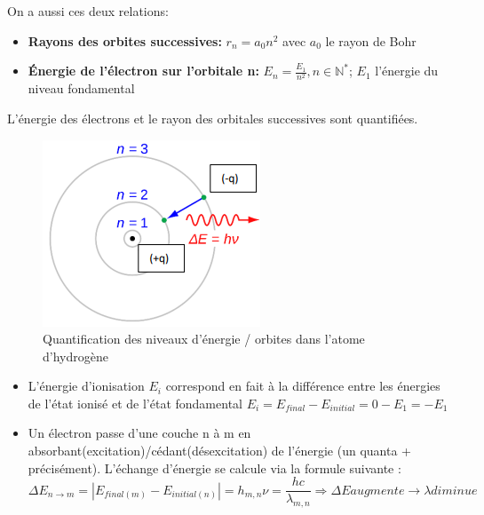 \documentclass{article}
\begin{document}
\noindent On a aussi ces deux relations:
\begin{itemize}
    \item \textbf{Rayons des orbites successives:} $r_{n} = a_{0}n^{2}$ avec $a_{0}$ le rayon de Bohr
    \item \textbf{Énergie de l'électron sur l'orbitale n:} $E_{n} = \frac{E_{1}}{n^{2}}, n\in\mathbb{N^{*}}$; $E_{1}$ l'énergie du niveau fondamental 
\end{itemize}
L'énergie des électrons et le rayon des orbitales successives sont quantifiées.
\begin{figure}[h]
    \centering
    \includegraphics[scale=0.5]{figure_2.png}
    \caption{Quantification des niveaux d'énergie / orbites dans l'atome d'hydrogène}
\end{figure}

\begin{itemize}
    \item L'énergie d'ionisation $E_{i}$ correspond en fait à la différence entre les énergies de l'état ionisé et de l'état fondamental $E_{i} = E_{final} - E_{initial} = 0 - E_{1} = -E_{1}$
    \item Un électron passe d'une couche n à m en absorbant(excitation)/cédant(désexcitation) de l'énergie (un quanta + précisément). L'échange d'énergie se calcule via la formule suivante :
    \[ \Delta E_{n\to m} = |E_{final(m)}-E_{initial(n)}| = h_{m,n}\nu = \frac{hc}{\lambda_{m,n}}  \Longrightarrow \Delta E augmente \rightarrow \lambda diminue \]
\end{itemize}
\end{document}
